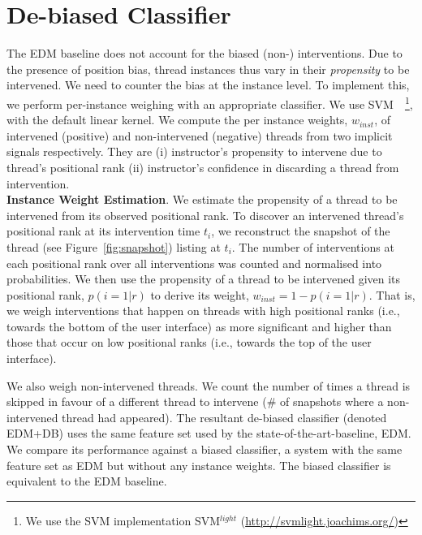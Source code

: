 \documentclass[11pt,a4paper]{article}
\begin{document}

\section{De-biased Classifier}
\label{sect:method}
The EDM baseline does not account for the biased (non-)
interventions. Due to the presence of position bias, thread instances
thus vary in their \textit{propensity} to be intervened. We need to
counter the bias at the instance level. To implement this, we perform
per-instance weighing with an appropriate classifier. We use
SVM~~\cite{joachims1999}\footnote{We use the SVM implementation SVM$^{light}$ 
(\url{http://svmlight.joachims.org/})}, 
with the default linear kernel. 
We compute the per instance weights, 
$w_{inst}$, of intervened (positive) and non-intervened (negative) threads 
from two implicit signals respectively. They are (i) instructor's 
propensity to intervene due to thread's positional rank
(ii) instructor's confidence in discarding a thread from intervention. \\

\textbf{Instance Weight Estimation}. We estimate the propensity of a
thread to be intervened from its observed positional rank. To
discover an intervened thread's positional rank at its intervention
time $t_i$, we reconstruct the snapshot of the thread (see
Figure~\ref{fig:snapshot}) listing at $t_i$. The number of
interventions at each positional rank over all interventions was
counted 
and normalised into probabilities. We then use the propensity 
of a thread to be intervened given its
positional rank, $p(i=1|r)$ to derive its weight, $w_{inst} = 1 -
p(i=1|r)$. That is, we weigh interventions that happen on threads with
high positional ranks (i.e., towards the bottom of the user interface)
as more significant and higher than those that occur on low positional
ranks (i.e., towards the top of the user interface).

We also weigh non-intervened threads. We count the number of
times a thread is skipped in favour of a different thread to intervene
(\# of snapshots where a non-intervened thread had appeared).
The resultant de-biased classifier (denoted EDM+DB) uses the
same feature set used by the state-of-the-art-baseline, EDM. We 
compare its performance against a biased classifier, a system with the 
same feature set as EDM but without any instance weights. The biased 
classifier is equivalent to the EDM baseline.
\end{document}
